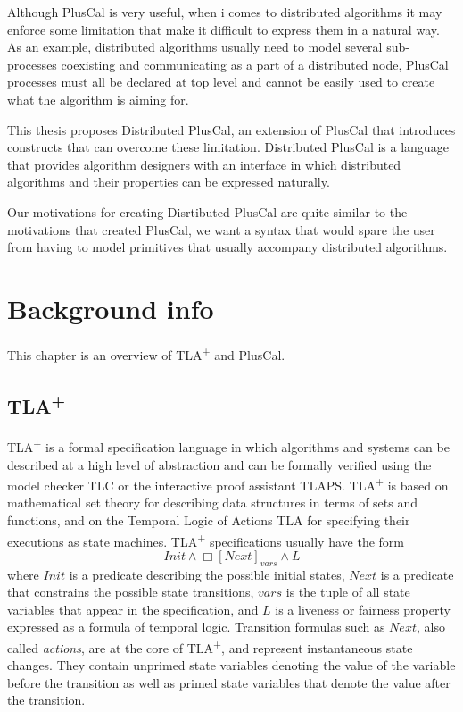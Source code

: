 \documentclass{thesul}
\newcommand{\tlaplus}{TLA\textsuperscript{+}\xspace}
\begin{document}
Although PlusCal is very useful, when i comes to distributed algorithms it may enforce some limitation that make it difficult to express them in a natural way. As an example, distributed algorithms usually need to model several sub-processes coexisting and communicating as a part of a distributed node, PlusCal processes must all be declared at top level and cannot be easily used to create what the algorithm is aiming for. 

This thesis proposes Distributed PlusCal, an extension of PlusCal that introduces constructs that can overcome these limitation. Distributed PlusCal is a language that provides algorithm designers with an interface in which distributed algorithms and their properties can be expressed naturally.

Our motivations for creating Disrtibuted PlusCal are quite similar to the motivations that created PlusCal, we want a syntax that would spare the user from having to model primitives that usually accompany distributed algorithms.


\chapter{Background info}

This chapter is an overview of \tlaplus and PlusCal.
\section{\tlaplus}

\tlaplus is a formal specification language in which algorithms and systems can be described at a high level of abstraction and can be formally verified using the model checker TLC or the interactive proof assistant TLAPS. \tlaplus is based on mathematical set theory for describing data structures in terms of sets and functions, and on the Temporal Logic of Actions TLA for specifying their executions as state machines. \tlaplus specifications usually have the form
\[
  Init \land \Box[Next]_{vars} \land L
\]
where $Init$ is a predicate describing the possible initial states, $Next$ is a predicate that constrains the possible state transitions, $vars$ is the tuple of all state variables that appear in the specification, and $L$ is a liveness or fairness property expressed as a formula of temporal logic. Transition formulas such as $Next$, also called \emph{actions}, are at the core of \tlaplus, and represent instantaneous state changes. They contain unprimed state variables denoting the value of the variable before the transition as well as primed state variables that denote the value after the transition.
\end{document}

